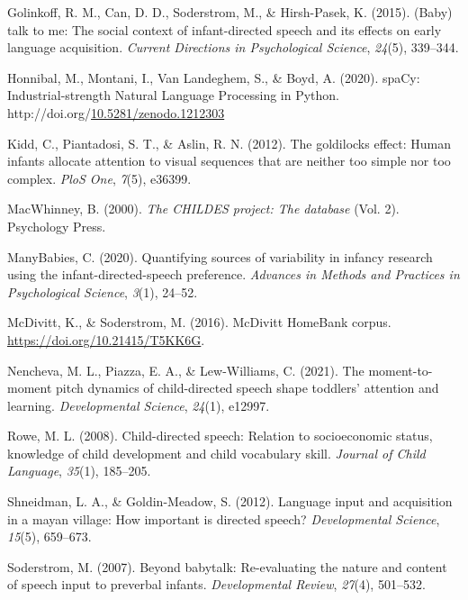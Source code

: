 \documentclass[10pt, letterpaper]{article}
\newenvironment{CSLReferences}%
  {}%
  {\par}
\begin{document}
\begin{CSLReferences}{1}{0}
\leavevmode\hypertarget{ref-golinkoff2015baby}{}%
Golinkoff, R. M., Can, D. D., Soderstrom, M., \& Hirsh-Pasek, K. (2015).
(Baby) talk to me: The social context of infant-directed speech and its
effects on early language acquisition. \emph{Current Directions in
Psychological Science}, \emph{24}(5), 339--344.

\leavevmode\hypertarget{ref-honnibal2020spacy}{}%
Honnibal, M., Montani, I., Van Landeghem, S., \& Boyd, A. (2020).
{spaCy: Industrial-strength Natural Language Processing in Python}.
http://doi.org/\href{https://doi.org/10.5281/zenodo.1212303}{10.5281/zenodo.1212303}

\leavevmode\hypertarget{ref-kidd2012goldilocks}{}%
Kidd, C., Piantadosi, S. T., \& Aslin, R. N. (2012). The goldilocks
effect: Human infants allocate attention to visual sequences that are
neither too simple nor too complex. \emph{PloS One}, \emph{7}(5),
e36399.

\leavevmode\hypertarget{ref-macwhinney2000childes}{}%
MacWhinney, B. (2000). \emph{The CHILDES project: The database} (Vol.
2). Psychology Press.

\leavevmode\hypertarget{ref-manybabies2020quantifying}{}%
ManyBabies, C. (2020). Quantifying sources of variability in infancy
research using the infant-directed-speech preference. \emph{Advances in
Methods and Practices in Psychological Science}, \emph{3}(1), 24--52.

\leavevmode\hypertarget{ref-soderstromcorpus}{}%
McDivitt, K., \& Soderstrom, M. (2016). McDivitt HomeBank corpus.
\url{https://doi.org/10.21415/T5KK6G}.

\leavevmode\hypertarget{ref-nencheva2021moment}{}%
Nencheva, M. L., Piazza, E. A., \& Lew-Williams, C. (2021). The
moment-to-moment pitch dynamics of child-directed speech shape toddlers'
attention and learning. \emph{Developmental Science}, \emph{24}(1),
e12997.

\leavevmode\hypertarget{ref-rowe2008child}{}%
Rowe, M. L. (2008). Child-directed speech: Relation to socioeconomic
status, knowledge of child development and child vocabulary skill.
\emph{Journal of Child Language}, \emph{35}(1), 185--205.

\leavevmode\hypertarget{ref-shneidman2012language}{}%
Shneidman, L. A., \& Goldin-Meadow, S. (2012). Language input and
acquisition in a mayan village: How important is directed speech?
\emph{Developmental Science}, \emph{15}(5), 659--673.

\leavevmode\hypertarget{ref-soderstrom2007beyond}{}%
Soderstrom, M. (2007). Beyond babytalk: Re-evaluating the nature and
content of speech input to preverbal infants. \emph{Developmental
Review}, \emph{27}(4), 501--532.


\end{CSLReferences}
\end{document}
